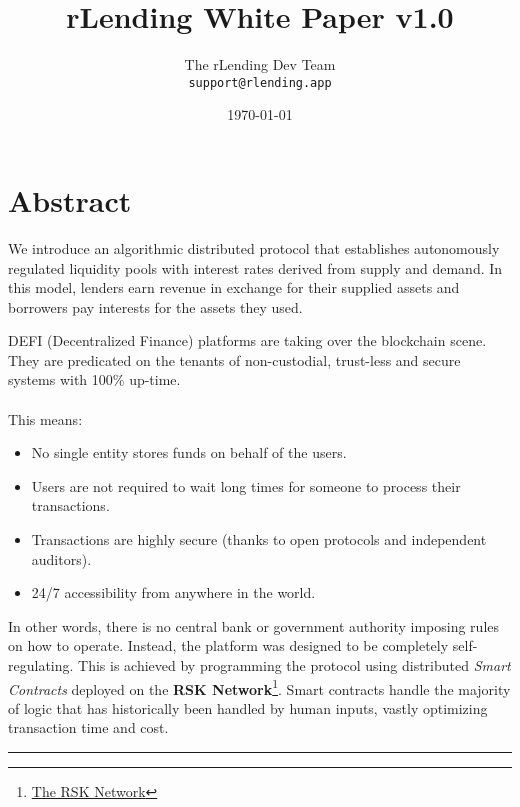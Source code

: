 \documentclass{article}
\title{rLending White Paper v1.0} %
\author{The rLending Dev Team\\ \texttt{support@rlending.app}} %
\date{ \today} %
\begin{document}
\maketitle %


\section*{Abstract} 

We introduce an algorithmic distributed protocol that establishes autonomously regulated liquidity pools with interest rates derived from supply and demand. In this model, lenders earn revenue in exchange for their supplied assets and borrowers pay interests for the assets they used.

DEFI (Decentralized Finance) platforms are taking over the blockchain scene. They are predicated on the tenants of non-custodial, trust-less and secure systems with 100\% up-time.
\\ \\
This means:
\begin{itemize}
\item No single entity stores funds on behalf of the users.
\item Users are not required to wait long times for someone to process their transactions.
\item Transactions are highly secure (thanks to open protocols and independent auditors).
\item 24/7 accessibility from anywhere in the world.
\end{itemize}
In other words, there is no central bank or government authority imposing rules on how to operate. Instead, the platform was designed to be completely self-regulating. This is achieved by programming the protocol using distributed \textit{Smart Contracts} deployed on the \textbf{RSK Network}\footnote{\href{https://www.rsk.co/}{The RSK Network}}. Smart contracts handle the majority of logic that has historically been handled by human inputs, vastly optimizing transaction time and cost.
\begin{center}
\noindent\rule{8cm}{0.4pt}
\end{center}

\end{document}
